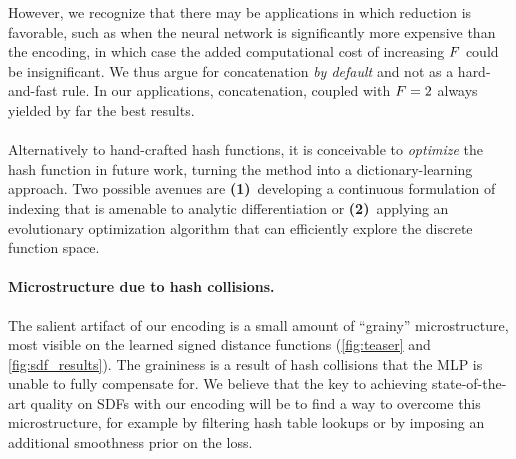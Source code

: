 \documentclass[acmtog,authorversion]{acmart}
\begin{document}
However, we recognize that there may be applications in which reduction is favorable, such as when the neural network is significantly more expensive than the encoding, in which case the added computational cost of increasing $F$ could be insignificant.
We thus argue for concatenation \emph{by default} and not as a hard-and-fast rule.
In our applications, concatenation, coupled with ${F=2}$ always yielded by far the best results.

\paragraph{}

Alternatively to hand-crafted hash functions, it is conceivable to \emph{optimize} the hash function in future work, turning the method into a dictionary-learning approach.
Two possible avenues are \textbf{(1)}~developing a continuous formulation of indexing that is amenable to analytic differentiation or \textbf{(2)}~applying an evolutionary optimization algorithm that can efficiently explore the discrete function space.

\paragraph{Microstructure due to hash collisions.}
The salient artifact of our encoding is a small amount of ``grainy'' microstructure, most visible on the learned signed distance functions (\autoref{fig:teaser} and \autoref{fig:sdf_results}).
The graininess is a result of hash collisions that the MLP is unable to fully compensate for.
We believe that the key to achieving state-of-the-art quality on SDFs with our encoding will be to find a way to overcome this microstructure, for example by filtering hash table lookups or by imposing an additional smoothness prior on the loss.
\end{document}
